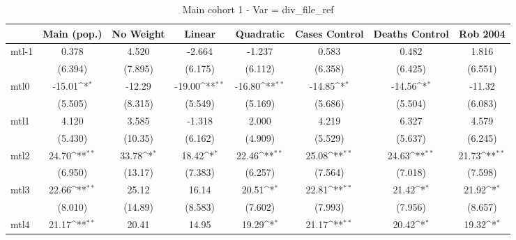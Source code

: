 \documentclass{article}
\begin{document}
{
\def\sym#1{\ifmmode^{#1}\else\(^{#1}\)\fi}
\begin{longtable}{l*{7}{c}}
\caption{Main cohort 1 - Var = div\_file\_ref}\\
\hline\hline\endfirsthead\hline\endhead\hline\endfoot\endlastfoot
                &\multicolumn{1}{c}{Main (pop.)}&\multicolumn{1}{c}{No Weight}&\multicolumn{1}{c}{Linear}&\multicolumn{1}{c}{Quadratic}&\multicolumn{1}{c}{Cases Control}&\multicolumn{1}{c}{Deaths Control}&\multicolumn{1}{c}{Rob 2004}\\
\hline
mtl-1           &    0.378         &    4.520         &   -2.664         &   -1.237         &    0.583         &    0.482         &    1.816         \\
                &  (6.394)         &  (7.895)         &  (6.175)         &  (6.112)         &  (6.358)         &  (6.425)         &  (6.551)         \\
mtl0            &   -15.01\sym{*}  &   -12.29         &   -19.00\sym{**} &   -16.80\sym{**} &   -14.85\sym{*}  &   -14.56\sym{*}  &   -11.32         \\
                &  (5.505)         &  (8.315)         &  (5.549)         &  (5.169)         &  (5.686)         &  (5.504)         &  (6.083)         \\
mtl1            &    4.120         &    3.585         &   -1.318         &    2.000         &    4.219         &    6.327         &    4.579         \\
                &  (5.430)         &  (10.35)         &  (6.162)         &  (4.909)         &  (5.529)         &  (5.637)         &  (6.245)         \\
mtl2            &    24.70\sym{**} &    33.78\sym{*}  &    18.42\sym{*}  &    22.46\sym{**} &    25.08\sym{**} &    24.63\sym{**} &    21.73\sym{**} \\
                &  (6.950)         &  (13.17)         &  (7.383)         &  (6.257)         &  (7.564)         &  (7.018)         &  (7.598)         \\
mtl3            &    22.66\sym{**} &    25.12         &    16.14         &    20.51\sym{*}  &    22.81\sym{**} &    21.42\sym{*}  &    21.92\sym{*}  \\
                &  (8.010)         &  (14.89)         &  (8.583)         &  (7.602)         &  (7.993)         &  (7.956)         &  (8.657)         \\
mtl4            &    21.17\sym{**} &    20.41         &    14.95         &    19.29\sym{*}  &    21.17\sym{**} &    20.42\sym{*}  &    19.32\sym{*}  \\

\end{longtable}}
\end{document}
